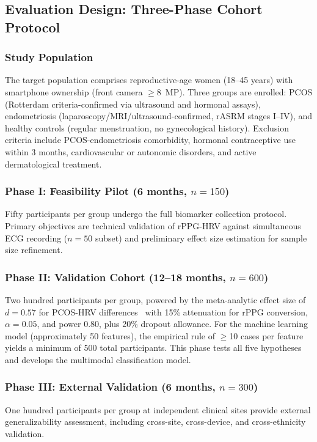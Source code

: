 \documentclass[conference]{IEEEtran}
\begin{document}
\subsection{Evaluation Design: Three-Phase Cohort Protocol}

\subsubsection{Study Population}
The target population comprises reproductive-age women (18--45 years) with smartphone ownership (front camera $\geq$8~MP). Three groups are enrolled: PCOS (Rotterdam criteria-confirmed via ultrasound and hormonal assays), endometriosis (laparoscopy/MRI/ultrasound-confirmed, rASRM stages I--IV), and healthy controls (regular menstruation, no gynecological history). Exclusion criteria include PCOS-endometriosis comorbidity, hormonal contraceptive use within 3 months, cardiovascular or autonomic disorders, and active dermatological treatment.

\subsubsection{Phase I: Feasibility Pilot (6 months, $n=150$)}
Fifty participants per group undergo the full biomarker collection protocol. Primary objectives are technical validation of rPPG-HRV against simultaneous ECG recording ($n=50$ subset) and preliminary effect size estimation for sample size refinement.

\subsubsection{Phase II: Validation Cohort (12--18 months, $n=600$)}
Two hundred participants per group, powered by the meta-analytic effect size of $d=0.57$ for PCOS-HRV differences~\cite{Mirzohreh_2024} with 15\% attenuation for rPPG conversion, $\alpha=0.05$, and power 0.80, plus 20\% dropout allowance. For the machine learning model (approximately 50 features), the empirical rule of $\geq$10 cases per feature yields a minimum of 500 total participants. This phase tests all five hypotheses and develops the multimodal classification model.

\subsubsection{Phase III: External Validation (6 months, $n=300$)}
One hundred participants per group at independent clinical sites provide external generalizability assessment, including cross-site, cross-device, and cross-ethnicity validation.
\end{document}
